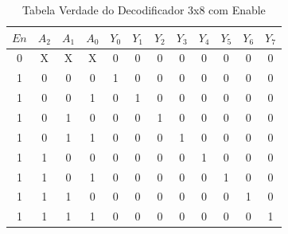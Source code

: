 \begin{table}[H]
    \centering
    \caption{Tabela Verdade do Decodificador 3x8 com Enable}
    \begin{tabular}{cccc|cccccccc}
        \toprule
        \textbf{$En$} & \textbf{$A_2$} & \textbf{$A_1$} & \textbf{$A_0$} & \textbf{$Y_0$} & \textbf{$Y_1$} & \textbf{$Y_2$} & \textbf{$Y_3$} & \textbf{$Y_4$} & \textbf{$Y_5$} & \textbf{$Y_6$} & \textbf{$Y_7$} \\
        \midrule
        0             & X              & X              & X              & 0              & 0              & 0              & 0              & 0              & 0              & 0              & 0              \\
        1             & 0              & 0              & 0              & 1              & 0              & 0              & 0              & 0              & 0              & 0              & 0              \\
        1             & 0              & 0              & 1              & 0              & 1              & 0              & 0              & 0              & 0              & 0              & 0              \\
        1             & 0              & 1              & 0              & 0              & 0              & 1              & 0              & 0              & 0              & 0              & 0              \\
        1             & 0              & 1              & 1              & 0              & 0              & 0              & 1              & 0              & 0              & 0              & 0              \\
        1             & 1              & 0              & 0              & 0              & 0              & 0              & 0              & 1              & 0              & 0              & 0              \\
        1             & 1              & 0              & 1              & 0              & 0              & 0              & 0              & 0              & 1              & 0              & 0              \\
        1             & 1              & 1              & 0              & 0              & 0              & 0              & 0              & 0              & 0              & 1              & 0              \\
        1             & 1              & 1              & 1              & 0              & 0              & 0              & 0              & 0              & 0              & 0              & 1              \\
        \bottomrule
    \end{tabular}
\end{table}

